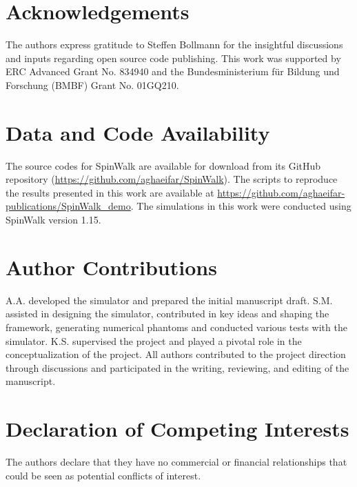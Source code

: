 

\section*{Acknowledgements}
The authors express gratitude to Steffen Bollmann for the insightful discussions and inputs regarding open source code publishing. This work was supported by ERC Advanced Grant No. 834940 and the Bundesministerium für Bildung und Forschung (BMBF) Grant No. 01GQ210.


\section*{Data and Code Availability}
The source codes for SpinWalk are available for download from its GitHub repository (\url{https://github.com/aghaeifar/SpinWalk}). The scripts to reproduce the results presented in this work are available at \url{https://github.com/aghaeifar-publications/SpinWalk_demo}. The simulations in this work were conducted using SpinWalk version 1.15. 

\section*{Author Contributions}

A.A. developed the simulator and prepared the initial manuscript draft. S.M. assisted in designing the simulator, contributed in key ideas and shaping the framework, generating numerical phantoms and conducted various tests with the simulator. K.S. supervised the project and played a pivotal role in the conceptualization of the project. All authors contributed to the project direction through discussions and participated in the writing, reviewing, and editing of the manuscript.


\section*{Declaration of Competing Interests}

The authors declare that they have no commercial or financial relationships that could be seen as potential conflicts of interest.

